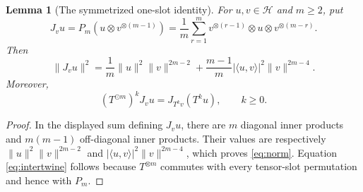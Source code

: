 \documentclass[11pt]{article}
\newtheorem{lemma}{Lemma}
\newcommand{\Hh}{\mathcal H}
\newcommand{\od}{\mathbin{\odot}}
\begin{document}
\begin{lemma}[The symmetrized one-slot identity]\label{lem:norm}
For $u,v\in\Hh$ and $m\ge2$, put
\[
 J_vu=P_m(u\otimes v^{\otimes(m-1)})
     =\frac1m\sum_{r=1}^m
       v^{\otimes(r-1)}\otimes u\otimes v^{\otimes(m-r)}.
\]
Then
\begin{equation}\label{eq:norm}
 \lVert J_vu\rVert^2
 =\frac1m\lVert u\rVert^2\lVert v\rVert^{2m-2}
  +\frac{m-1}{m}|\langle u,v\rangle|^2\lVert v\rVert^{2m-4}.
\end{equation}
Moreover,
\begin{equation}\label{eq:intertwine}
 (T^{\od m})^kJ_vu=J_{T^kv}(T^ku),\qquad k\ge0.
\end{equation}
\end{lemma}

\begin{proof}
In the displayed sum defining $J_vu$, there are $m$ diagonal inner products
and $m(m-1)$ off-diagonal inner products.  Their values are respectively
$\lVert u\rVert^2\lVert v\rVert^{2m-2}$ and
$|\langle u,v\rangle|^2\lVert v\rVert^{2m-4}$, which proves
\eqref{eq:norm}.  Equation \eqref{eq:intertwine} follows because
$T^{\otimes m}$ commutes with every tensor-slot permutation and hence with
$P_m$.
\end{proof}
\end{document}
